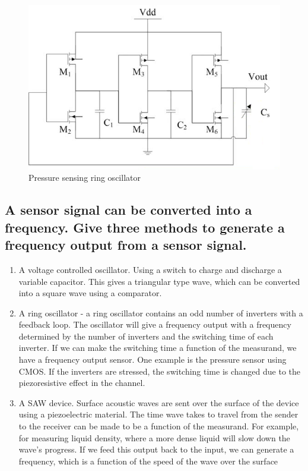 \documentclass[10pt,a4paper]{article}
\begin{document}
\begin{figure}[h!]
	\centering
	\includegraphics[width=\textwidth]{ring-cap.png}
	\caption{Pressure sensing ring oscillator}
	\label{fig:ring-cap}
\end{figure}

\subsection{A sensor signal can be converted into a frequency. Give three methods to generate a frequency output from a
sensor signal.}

\begin{enumerate}

	\item A voltage controlled oscillator. Using a switch to charge and discharge a variable capacitor. This gives a triangular type wave, which can be converted into a square wave using a comparator.
	\item A ring oscillator - a ring oscillator contains an odd number of inverters with a feedback loop. The oscillator will give a frequency output with a frequency determined by the number of inverters and the switching time of each inverter. If we can make the switching time a function of the measurand, we have a frequency output sensor. One example is the pressure sensor using CMOS. If the inverters are stressed, the switching time is changed due to the piezoresistive effect in the channel.
	\item A SAW device. Surface acoustic waves are sent over the surface of the device using a piezoelectric material. The time wave takes to travel from the sender to the receiver can be made to be a function of the measurand. For example, for measuring liquid density, where a more dense liquid will slow down the wave's progress. If we feed this output back to the input, we can generate a frequency, which is a function of the speed of the wave over the surface
\end{enumerate}
\end{document}
